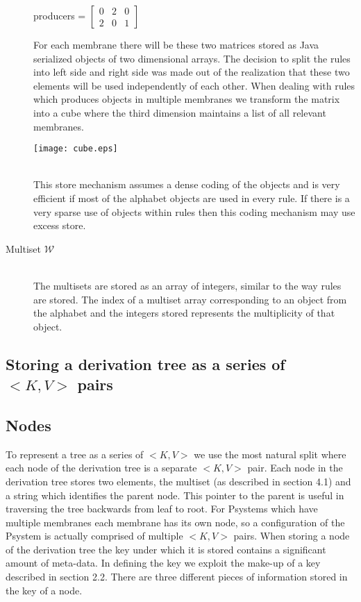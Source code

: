\documentclass[runningheads]{llncs}
\begin{document}
\begin{description}
producers = $\begin{bmatrix} 0 & 2 & 0 \\  2 & 0 & 1  \end{bmatrix} $ 

For each membrane there will be these two matrices stored as Java serialized objects of two dimensional arrays. The decision to split the rules into left side and right side was made out of the realization that these two elements will be used independently of each other. 
When dealing with rules which produces objects in multiple membranes we transform the matrix into a cube where the third dimension maintains a list of all relevant membranes. 

\begin{minipage}{\textwidth}
    \centering
    \texttt{[image: cube.eps]}
\end{minipage} \\ 

This store mechanism assumes a dense coding of the objects and is very efficient if most of the alphabet objects are used in every rule. If there is a very sparse use of objects within rules then this coding mechanism may use excess store. \\

\item[Multiset $\mathcal{W}$] \hfill \\
The multisets are stored as an array of integers, similar to the way rules are stored. The index of a multiset array corresponding to an object from the alphabet and the integers stored represents the multiplicity of that object. 

\end{description}
 
\subsection{Storing a derivation tree as a series of $<K,V>$ pairs}

\subsection*{Nodes}
To represent a tree as a series of $<K,V>$ we use the most natural split where each node of the derivation tree is a separate $<K,V>$ pair. Each node in the derivation tree stores two elements, the multiset (as described in section 4.1) and a string which identifies the parent node. This pointer to the parent is useful in traversing the tree backwards from leaf to root. For Psystems which have multiple membranes each membrane has its own node, so a configuration of the Psystem is actually comprised of multiple $<K,V>$ pairs. When storing a node of the derivation tree the key under which it is stored contains a significant amount of meta-data. In defining the key we exploit the make-up of a key described in section 2.2. There are three different pieces of information stored in the key of a node.  
\end{document}
